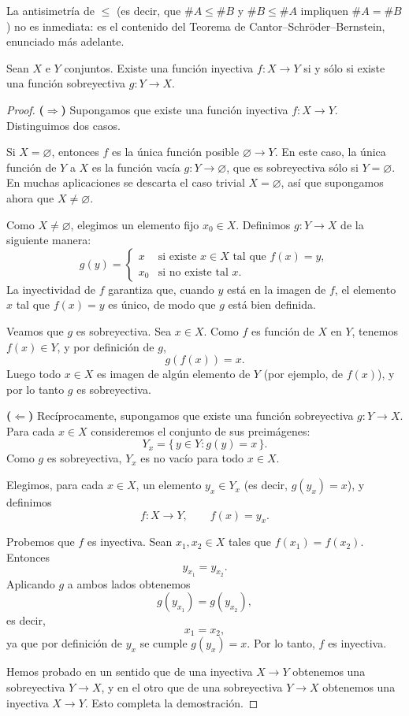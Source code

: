 \begin{obs}
La antisimetría de $\le$ (es decir, que $\#A \le \#B$ y $\#B \le \#A$
impliquen $\#A = \#B$) no es inmediata: es el contenido del Teorema de
Cantor--Schröder--Bernstein, enunciado más adelante.
\end{obs}

\begin{prop}
Sean $X$ e $Y$ conjuntos. Existe una función inyectiva
$f : X \to Y$ si y sólo si existe una función sobreyectiva
$g : Y \to X$.
\end{prop}

\begin{proof}
\textbf{($\Rightarrow$)} Supongamos que existe una función inyectiva
$f : X \to Y$. Distinguimos dos casos.

Si $X = \varnothing$, entonces $f$ es la única función posible
$\varnothing \to Y$. En este caso, la única función de $Y$ a $X$
es la función vacía $g : Y \to \varnothing$, que es sobreyectiva
sólo si $Y = \varnothing$. En muchas aplicaciones se descarta el
caso trivial $X = \varnothing$, así que supongamos ahora que
$X \ne \varnothing$.

Como $X \ne \varnothing$, elegimos un elemento fijo $x_0 \in X$.
Definimos $g : Y \to X$ de la siguiente manera:
\[
g(y) =
\begin{cases}
x & \text{si existe } x \in X \text{ tal que } f(x) = y,\\
x_0 & \text{si no existe tal } x.
\end{cases}
\]
La inyectividad de $f$ garantiza que, cuando $y$ está en la imagen
de $f$, el elemento $x$ tal que $f(x) = y$ es único, de modo que
$g$ está bien definida.

Veamos que $g$ es sobreyectiva. Sea $x \in X$. Como $f$ es función
de $X$ en $Y$, tenemos $f(x) \in Y$, y por definición de $g$,
\[
g(f(x)) = x.
\]
Luego todo $x \in X$ es imagen de algún elemento de $Y$ (por ejemplo,
de $f(x)$), y por lo tanto $g$ es sobreyectiva.

\medskip

\textbf{($\Leftarrow$)} Recíprocamente, supongamos que existe una función
sobreyectiva $g : Y \to X$. Para cada $x \in X$ consideremos el conjunto
de sus preimágenes:
\[
Y_x = \{\, y \in Y : g(y) = x \,\}.
\]
Como $g$ es sobreyectiva, $Y_x$ es no vacío para todo $x \in X$.

Elegimos, para cada $x \in X$, un elemento $y_x \in Y_x$ (es decir,
$g(y_x) = x$), y definimos
\[
f : X \to Y, \qquad f(x) = y_x.
\]

Probemos que $f$ es inyectiva. Sean $x_1,x_2 \in X$ tales que
$f(x_1) = f(x_2)$. Entonces
\[
y_{x_1} = y_{x_2}.
\]
Aplicando $g$ a ambos lados obtenemos
\[
g(y_{x_1}) = g(y_{x_2}),
\]
es decir,
\[
x_1 = x_2,
\]
ya que por definición de $y_x$ se cumple $g(y_x) = x$. Por lo tanto,
$f$ es inyectiva.

\medskip

Hemos probado en un sentido que de una inyectiva $X \to Y$ obtenemos
una sobreyectiva $Y \to X$, y en el otro que de una sobreyectiva
$Y \to X$ obtenemos una inyectiva $X \to Y$. Esto completa la
demostración.
\end{proof}

